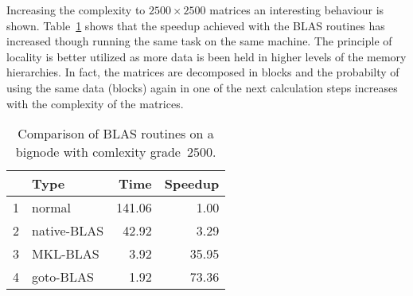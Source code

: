 Increasing the complexity to $2500 \times 2500$ matrices an
interesting behaviour is shown. Table~\ref{tab:mm_seqsblas2500} shows
that the speedup achieved with the BLAS routines  has increased though
running the same task on the same machine. The principle of locality
is better utilized as more data is been held in higher levels of the
memory hierarchies. In fact, the matrices are decomposed in blocks and
the probabilty of using the same data (blocks) again in one of the next
calculation steps increases with the complexity of the matrices.

\begin{table}[ht]
\begin{center}
\begin{tabular}{rlrr}
  \hline
 & Type & Time & Speedup \\
  \hline
1 & normal & 141.06 & 1.00 \\
  2 & native-BLAS & 42.92 & 3.29 \\
  3 & MKL-BLAS & 3.92 & 35.95 \\
  4 & goto-BLAS & 1.92 & 73.36 \\
   \hline
\end{tabular}
\caption{Comparison of BLAS routines on a bignode with comlexity grade~$2500$.}
\label{tab:mm_seqsblas2500}
\end{center}
\end{table}